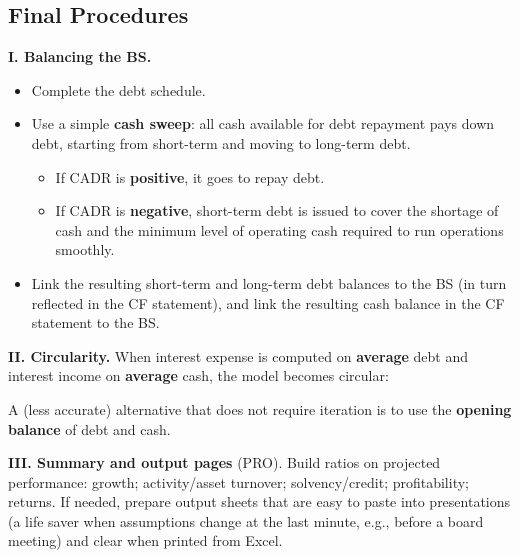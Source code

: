 \subsection[Final Procedures]{Final Procedures }

\textbf{I. Balancing the BS.}
\begin{itemize}
  \item Complete the debt schedule.
  \item Use a simple \textbf{cash sweep}: all cash available for debt repayment pays down debt, starting from short-term and moving to long-term debt.
  \begin{itemize}
    \item If CADR is \textbf{positive}, it goes to repay debt.
    \item If CADR is \textbf{negative}, short-term debt is issued to cover the shortage of cash and the minimum level of operating cash required to run operations smoothly.
  \end{itemize}
  \item Link the resulting short-term and long-term debt balances to the BS (in turn reflected in the CF statement), and link the resulting cash balance in the CF statement to the BS.
\end{itemize}

\textbf{II. Circularity.} When interest expense is computed on \textbf{average} debt and interest income on \textbf{average} cash, the model becomes circular:
\begin{center}
\end{center}
A (less accurate) alternative that does not require iteration is to use the \textbf{opening balance} of debt and cash.

\textbf{III. Summary and output pages} (PRO). Build ratios on projected performance: growth; activity/asset turnover; solvency/credit; profitability; returns. If needed, prepare output sheets that are easy to paste into presentations (a life saver when assumptions change at the last minute, e.g., before a board meeting) and clear when printed from Excel.

